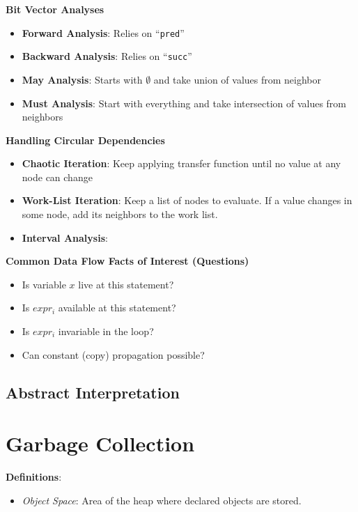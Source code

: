 \documentclass[10pt,twocolumn]{report}
\begin{document}
  \textbf{Bit Vector Analyses}
  \begin{itemize}
    \item \textbf{Forward Analysis}: Relies on ``\texttt{pred}''
    \item \textbf{Backward Analysis}: Relies on ``\texttt{succ}''
    \item \textbf{May Analysis}: Starts with $\emptyset$ and take union of values from neighbor
    \item \textbf{Must Analysis}: Start with everything and take intersection of values from neighbors
  \end{itemize}

  \textbf{Handling Circular Dependencies}
  \begin{itemize}
    \item \textbf{Chaotic Iteration}: Keep applying transfer function until no value at any node can change
    \item \textbf{Work-List Iteration}: Keep a list of nodes to evaluate. If a value changes in some node, add its neighbors to the work list.
    \item \textbf{Interval Analysis}:
  \end{itemize}
  
  \textbf{Common Data Flow Facts of Interest (Questions)}
  \begin{itemize}
    \item Is variable $x$ live at this statement?
    \item Is $expr_i$ available at this statement?
    \item Is $expr_i$ invariable in the loop?
    \item Can constant (copy) propagation possible?
  \end{itemize}

\subsection{Abstract Interpretation}


\section{Garbage Collection}

  \textbf{Definitions}:
  
  \begin{itemize}
    \item \textit{Object Space}: Area of the heap where declared objects are stored.
  \end{itemize}
\end{document}
